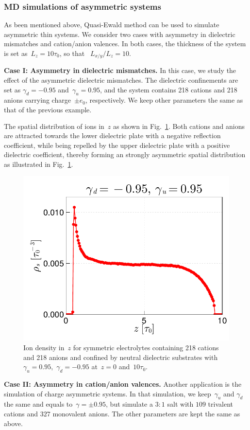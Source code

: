 \subsubsection{MD simulations of asymmetric systems}
As been mentioned above, Quasi-Ewald method can be used to simulate asymmetric thin systems.
We consider two cases with asymmetry in dielectric mismatches and cation/anion valences.
In both cases, the thickness of the system is set as~$L_z = 10 \tau_0$, so that ~$L_{x/y} / L_z = 10$.

\textbf{Case I: Asymmetry in dielectric mismatches.}
In this case, we study the effect of the asymmetric dielectric mismatches.
The dielectric confinements are set as $\gamma_d = -0.95$ and~$\gamma_u = 0.95$, and the system contains 218 cations and 218 anions carrying charge~$\pm e_0$, respectively.
We keep other parameters the same as that of the previous example.

The spatial distribution of ions in~$z$ as shown in Fig.~\ref{fig:non_sym}.
Both cations and anions are attracted towards the lower dielectric plate with a negative reflection coefficient, while being repelled by the upper dielectric plate with a positive dielectric coefficient, thereby forming an strongly asymmetric spatial distribution as illustrated in Fig.~\ref{fig:non_sym}.

\begin{figure}[htb]
    \centering
    \includegraphics[width = 0.625\linewidth]{figs/non_symm.pdf}
    \caption{
        Ion density in~$z$ for symmetric electrolytes containing 218 cations and 218 anions and confined by neutral dielectric substrates with $\gamma_u = 0.95$,~$\gamma_d = -0.95$ at~$z = 0$ and~$10\tau_0$.
    }
    \label{fig:non_sym}
\end{figure}

\textbf{Case II: Asymmetry in cation/anion valences.}
Another application is the simulation of charge asymmetric systems.
In that simulation, we keep~$\gamma_u$ and $\gamma_d$ the same and equals to~$\gamma = \pm 0.95$, but simulate a $3:1$ salt with $109$ trivalent cations and $327$ monovalent anions. 
The other parameters are kept the same as above.

